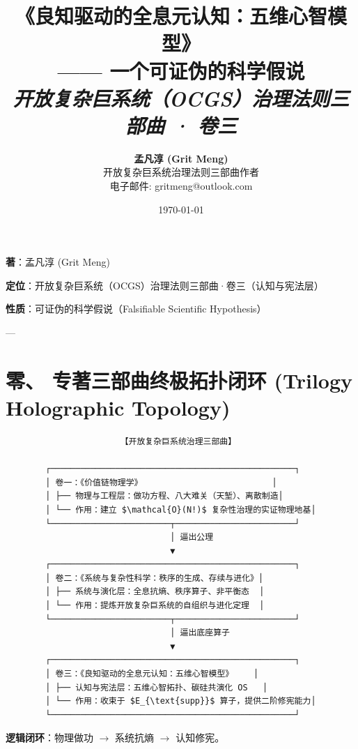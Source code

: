 \documentclass[11pt,a4paper,oneside]{ctexart}
\title{\textbf{\Huge 《良知驱动的全息元认知：五维心智模型》}\\[0.5em]
\Large —— 一个可证伪的科学假说\\[0.8em]
\small \textit{开放复杂巨系统（OCGS）治理法则三部曲 · 卷三}}
\author{\textbf{\Large 孟凡淳 (Grit Meng)}\\[0.3em]
\small 开放复杂巨系统治理法则三部曲作者\\
\small 电子邮件: gritmeng@outlook.com}
\date{\today}
\begin{document}
\maketitle

\clearpage
\tableofcontents
\clearpage

\begin{notebox}
\textbf{著}：孟凡淳 (Grit Meng)

\textbf{定位}：开放复杂巨系统（OCGS）治理法则三部曲·卷三（认知与宪法层）

\textbf{性质}：可证伪的科学假说（Falsifiable Scientific Hypothesis）
\end{notebox}

---


\section{零、 专著三部曲终极拓扑闭环 (Trilogy Holographic Topology)}

\begin{tcolorbox}[colback=gray!5!white,colframe=gray!50!black,fontupper=\ttfamily\small]
\begin{verbatim}
                       【开放复杂巨系统治理三部曲】

        ┌─────────────────────────────────────────────────┐
        │ 卷一：《价值链物理学》                          │
        │ ├── 物理与工程层：做功方程、八大难关（天堑）、离散制造│
        │ └── 作用：建立 $\mathcal{O}(N!)$ 复杂性治理的实证物理地基│
        └────────────────────────┬────────────────────────┘
                                 │ 逼出公理
                                 ▼
        ┌─────────────────────────────────────────────────┐
        │ 卷二：《系统与复杂性科学：秩序的生成、存续与进化》│
        │ ├── 系统与演化层：全息抗熵、秩序算子、非平衡态  │
        │ └── 作用：提炼开放复杂巨系统的自组织与进化定理  │
        └────────────────────────┬────────────────────────┘
                                 │ 逼出底座算子
                                 ▼
        ┌─────────────────────────────────────────────────┐
        │ 卷三：《良知驱动的全息元认知：五维心智模型》    │
        │ ├── 认知与宪法层：五维心智拓扑、碳硅共演化 OS   │
        │ └── 作用：收束于 $E_{\text{supp}}$ 算子，提供二阶修宪能力│
        └─────────────────────────────────────────────────┘
\end{verbatim}
\end{tcolorbox}

\textbf{逻辑闭环}：物理做功 $\longrightarrow$ 系统抗熵 $\longrightarrow$ 认知修宪。
\end{document}
